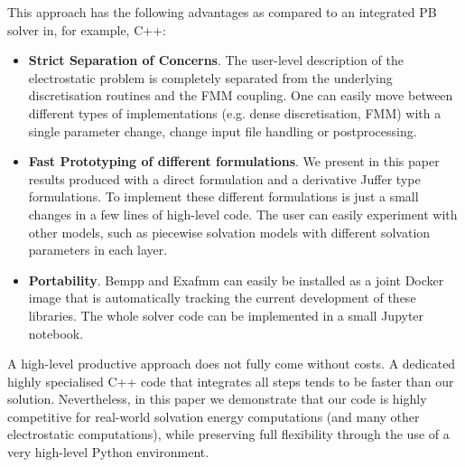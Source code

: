 This approach has the following advantages as compared to an integrated PB solver in, for example, C++:
\begin{itemize}
	\item \textbf{Strict Separation of Concerns}. The user-level description of the electrostatic problem is completely separated from the underlying discretisation routines and the FMM coupling. One can easily move between different types of implementations (e.g. dense discretisation, FMM) with a single parameter change, change input file handling or postprocessing.
	\item \textbf{Fast Prototyping of different formulations}. We present in this paper results produced with a direct formulation and a derivative Juffer type formulations. To implement these different formulations is just a small changes in a few lines of high-level code. The user can easily experiment with other models, such as piecewise solvation models with different solvation parameters in each layer.
	\item \textbf{Portability}. Bempp and Exafmm can easily be installed as a joint Docker image that is automatically tracking the current development of these libraries. The whole solver code can be implemented in a small Jupyter notebook.
\end{itemize}
A high-level productive approach does not fully come without costs. A dedicated highly specialised C++ code that integrates all steps tends to be faster than our solution. Nevertheless, in this paper we demonstrate that our code is highly competitive for real-world solvation energy computations (and many other electrostatic computations), while preserving full flexibility through the use of a very high-level Python environment.



